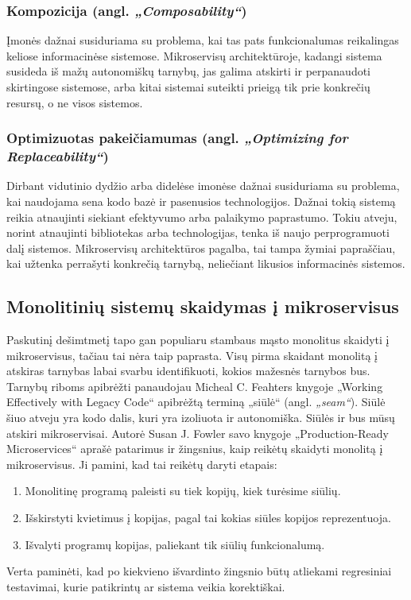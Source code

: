 \subsubsection{Kompozicija (angl. \textit{„Composability“})}
Įmonės dažnai susiduriama su problema, kai tas pats funkcionalumas reikalingas keliose informacinėse sistemose.
Mikroservisų architektūroje, kadangi sistema susideda iš mažų autonomiškų tarnybų, jas galima atskirti ir perpanaudoti
skirtingose sistemose, arba kitai sistemai suteikti prieigą tik prie konkrečių resursų, o ne visos sistemos.
\subsubsection{Optimizuotas pakeičiamumas (angl. \textit{„Optimizing for Replaceability“})}
Dirbant vidutinio dydžio arba didelėse imonėse dažnai susiduriama su problema, kai naudojama sena kodo bazė ir pasenusios technologijos.
Dažnai tokią sistemą reikia atnaujinti siekiant efektyvumo arba palaikymo paprastumo. Tokiu atveju, norint
atnaujinti bibliotekas arba technologijas, tenka iš naujo perprogramuoti dalį sistemos. Mikroservisų architektūros pagalba,
tai tampa žymiai papraščiau, kai užtenka perrašyti konkrečią tarnybą, neliečiant likusios informacinės sistemos.
\subsection{Monolitinių sistemų skaidymas į mikroservisus}
Paskutinį dešimtmetį tapo gan populiaru stambaus mąsto monolitus skaidyti į mikroservisus, tačiau tai nėra taip paprasta.
Visų pirma skaidant monolitą į atskiras tarnybas labai svarbu identifikuoti, kokios mažesnės tarnybos bus.
Tarnybų riboms apibrėžti panaudojau Micheal C. Feahters knygoje „Working Effectively with Legacy Code“ \cite{Bk5} apibrėžtą terminą
„siūlė“ (angl. \textit{„seam“}). Siūlė šiuo atveju yra kodo dalis, kuri yra izoliuota ir autonomiška.
Siūlės ir bus mūsų atskiri mikroservisai.
Autorė Susan J. Fowler savo knygoje „Production-Ready Microservices“ \cite{Bk1} aprašė patarimus ir žingsnius,
kaip reikėtų skaidyti monolitą į mikroservisus. Ji pamini, kad tai reikėtų daryti etapais:
\begin{enumerate}
	\item Monolitinę programą paleisti su tiek kopijų, kiek turėsime siūlių.
	\item Išskirstyti kvietimus į kopijas, pagal tai kokias siūles kopijos reprezentuoja.
	\item Išvalyti programų kopijas, paliekant tik siūlių funkcionalumą.
\end{enumerate}
Verta paminėti, kad po kiekvieno išvardinto žingsnio būtų atliekami regresiniai testavimai, kurie patikrintų
ar sistema veikia korektiškai.

